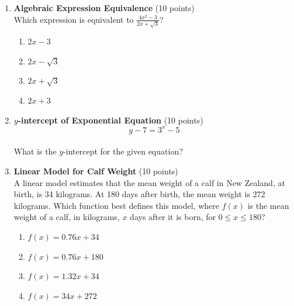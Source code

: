 \begin{enumerate}
  \item \textbf{Algebraic Expression Equivalence} (10 points)\\
  Which expression is equivalent to $\frac{4 x^2-3}{2 x+\sqrt{3}}$?
  \begin{enumerate}[label=\Alph*.]
    \item $2x-3$
    \item $2x-\sqrt{3}$
    \item $2x+\sqrt{3}$
    \item $2x+3$
  \end{enumerate}
  \begin{subanswer}
  \end{subanswer}

  \item \textbf{$y$-intercept of Exponential Equation} (10 points)\\
  $$y-7=3^x-5$$\\
  What is the $y$-intercept for the given equation?
  \begin{subanswer}
  \end{subanswer}

  \item \textbf{Linear Model for Calf Weight} (10 points)\\
  A linear model estimates that the mean weight of a calf in New Zealand, at birth, is 34 kilograms. At 180 days after birth, the mean weight is 272 kilograms. Which function best defines this model, where $f(x)$ is the mean weight of a calf, in kilograms, $x$ days after it is born, for $0 \leq x \leq 180$?
  \begin{enumerate}[label=\Alph*.]
    \item $f(x)=0.76 x+34$
    \item $f(x)=0.76 x+180$
    \item $f(x)=1.32 x+34$
    \item $f(x)=34 x+272$
  \end{enumerate}
  \begin{subanswer}
  \end{subanswer}

  \newpage


\end{enumerate}
